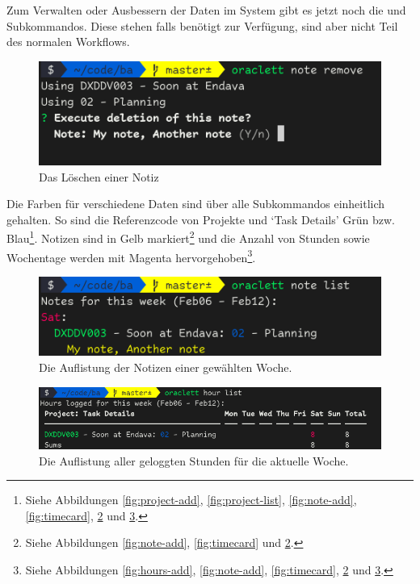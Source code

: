 \documentclass[oneside,bibliography=totocnumbered,BCOR=5mm]{scrbook}
\begin{document}
Zum Verwalten oder Ausbessern der Daten im System gibt es jetzt noch die
 und  Subkommandos. Diese stehen falls
benötigt zur Verfügung, sind aber nicht Teil des normalen Workflows.

\begin{figure}[H]
  \centering
  \includegraphics[scale=0.5]{note-remove.png}
  \caption{Das Löschen einer Notiz}
  \label{fig:note-remove}
\end{figure}

Die Farben für verschiedene Daten sind über alle  Subkommandos
einheitlich gehalten. So sind die Referenzcode von Projekte und `Task
Details' Grün bzw. Blau\footnote{Siehe Abbildungen \ref{fig:project-add},
\ref{fig:project-list}, \ref{fig:note-add}, \ref{fig:timecard},
\ref{fig:note-list} und \ref{fig:hour-list}.}. Notizen sind in Gelb
markiert\footnote{Siehe Abbildungen \ref{fig:note-add}, \ref{fig:timecard}
und \ref{fig:note-list}.} und die Anzahl von Stunden sowie Wochentage werden
mit Magenta hervorgehoben\footnote{Siehe Abbildungen \ref{fig:hours-add},
\ref{fig:note-add}, \ref{fig:timecard}, \ref{fig:note-list} und
\ref{fig:hour-list}.}.

\begin{figure}[H]
  \centering
  \includegraphics[scale=0.65]{note-list.png}
  \caption{Die Auflistung der Notizen einer gewählten Woche.}
  \label{fig:note-list}
\end{figure}

\begin{figure}[H]
  \centering
  \includegraphics[scale=0.55]{hour-list.png}
  \caption{Die Auflistung aller geloggten Stunden für die aktuelle Woche.}
  \label{fig:hour-list}
\end{figure}
\end{document}
